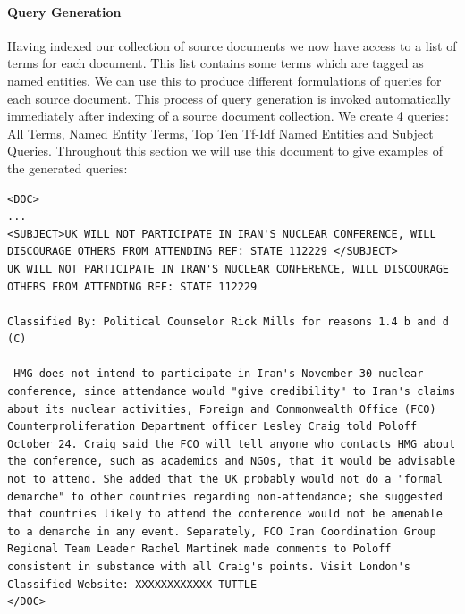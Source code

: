 \documentclass{l4proj}
\newenvironment{codelisting}{\captionsetup{type=listing}}{}
\begin{document}
\paragraph{Query Generation} \label{querygen}
Having indexed our collection of source documents we now have access to a list of terms for each document. This list contains some terms which are tagged as named entities. We can use this to produce different formulations of queries for each source document. This process of query generation is invoked automatically immediately after indexing of a source document collection.
We create 4 queries: All Terms, Named Entity Terms, Top Ten Tf-Idf Named Entities and Subject Queries.
Throughout this section we will use this document to give examples of the generated queries:
\begin{codelisting}
\begin{verbatim}
<DOC>
...
<SUBJECT>UK WILL NOT PARTICIPATE IN IRAN'S NUCLEAR CONFERENCE, WILL DISCOURAGE OTHERS FROM ATTENDING REF: STATE 112229 </SUBJECT>
UK WILL NOT PARTICIPATE IN IRAN'S NUCLEAR CONFERENCE, WILL DISCOURAGE OTHERS FROM ATTENDING REF: STATE 112229

Classified By: Political Counselor Rick Mills for reasons 1.4 b and d (C)

 HMG does not intend to participate in Iran's November 30 nuclear conference, since attendance would "give credibility" to Iran's claims about its nuclear activities, Foreign and Commonwealth Office (FCO) Counterproliferation Department officer Lesley Craig told Poloff October 24. Craig said the FCO will tell anyone who contacts HMG about the conference, such as academics and NGOs, that it would be advisable not to attend. She added that the UK probably would not do a "formal demarche" to other countries regarding non-attendance; she suggested that countries likely to attend the conference would not be amenable to a demarche in any event. Separately, FCO Iran Coordination Group Regional Team Leader Rachel Martinek made comments to Poloff consistent in substance with all Craig's points. Visit London's Classified Website: XXXXXXXXXXXX TUTTLE
</DOC>
\end{verbatim}
\label{code:example_source_document}
\end{codelisting}
\end{document}
